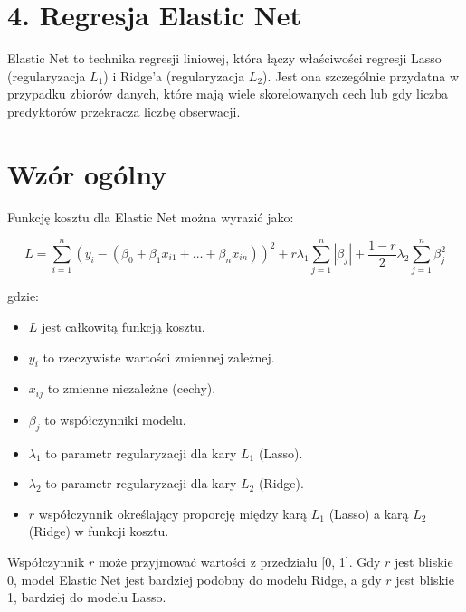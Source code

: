 {}
\justify
\fontsize{14}{16}\selectfont
\setlength{\parindent}{0pt}

\section*{4. Regresja Elastic Net \cite{alma991000280759708832}}
\label{sec:machine_learning_overview}
\fontsize{12}{14}\selectfont
\vspace{-1.0em}

Elastic Net to technika regresji liniowej, która łączy właściwości regresji Lasso (regularyzacja $L_1$) i Ridge'a (regularyzacja $L_2$). Jest ona szczególnie przydatna w przypadku zbiorów danych, które mają wiele skorelowanych cech lub gdy liczba predyktorów przekracza liczbę obserwacji.

{}
\section*{Wzór ogólny}
\vspace{-1.0em}
\label{sec:what_is_ml}


Funkcję kosztu dla Elastic Net można wyrazić jako:
\begin{center}
    $$
L = \sum_{i=1}^{n} (y_i - (\beta_0 + \beta_1 x_{i1} + \ldots + \beta_n x_{in}))^2 + r \lambda_1 \sum_{j=1}^{n} |\beta_j| + \frac{1-r}{2}\lambda_2 \sum_{j=1}^{n} \beta_j^2
$$
\end{center}


gdzie:
\begin{itemize}
\setlength\itemsep{-0.5em}
\item $L$ jest całkowitą funkcją kosztu.
\item $y_i$ to rzeczywiste wartości zmiennej zależnej.
 \item  $x_{ij}$ to zmienne niezależne (cechy).
 \item  $\beta_j$ to współczynniki modelu.
 \item  $\lambda_1$ to parametr regularyzacji dla kary $L_1$ (Lasso).
 \item  $\lambda_2$ to parametr regularyzacji dla kary $L_2$ (Ridge).
 \item  $r$ współczynnik określający proporcję między karą $L_1$ (Lasso) a karą $L_2$ (Ridge) w funkcji kosztu.
\end{itemize}
\item 

Współczynnik $r$ może przyjmować wartości z przedziału [0, 1]. Gdy $r$ jest bliskie 0, model Elastic Net jest bardziej podobny do modelu Ridge, a gdy $r$ jest bliskie 1, bardziej do modelu Lasso.


